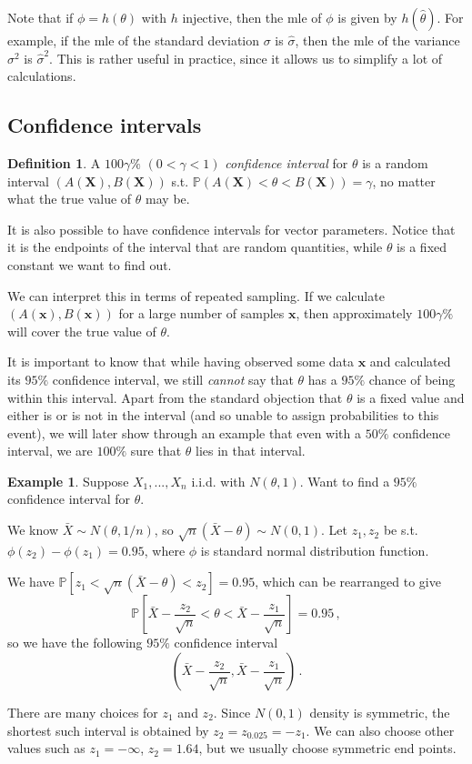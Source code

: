 \documentclass[a4paper,11pt]{article}
\theoremstyle{definition}
\newtheorem*{defn}{Definition}
\newtheorem*{ex}{Example}
\numberwithin{equation}{section}
\begin{document}
Note that if $\phi=h(\theta)$ with $h$ injective, then the mle of $\phi$ is given by $h(\hat{\theta})$. For example, if the mle of the standard deviation $\sigma$ is $\hat{\sigma}$, then the mle of the variance $\sigma^2$ is $\hat{\sigma}^2$. This is rather useful in practice, since it allows us to simplify a lot of calculations.

\subsection{Confidence intervals}
\begin{defn}
A $100\gamma\%$ $(0<\gamma<1)$ \emph{confidence interval} for $\theta$ is a random interval $(A(\mathbf{X}),B(\mathbf{X}))$ s.t. $\mathbb{P}(A(\mathbf{X})<\theta<B(\mathbf{X}))=\gamma$, no matter what the true value of $\theta$ may be.
\end{defn}

It is also possible to have confidence intervals for vector parameters. Notice that it is the endpoints of the interval that are random quantities, while $\theta$ is a fixed constant we want to find out.

We can interpret this in terms of repeated sampling. If we calculate $(A(\mathbf{x}),B(\mathbf{x}))$ for a large number of samples $\mathbf{x}$, then approximately $100\gamma\%$ will cover the true value of $\theta$.

It is important to know that while having observed some data $\mathbf{x}$ and calculated its $95\%$ confidence interval, we still \emph{cannot} say that $\theta$ has a $95\%$ chance of being within this interval. Apart from the standard objection that $\theta$ is a fixed value and either is or is not in the interval (and so unable to assign probabilities to this event), we will later show through an example that even with a $50\%$ confidence interval, we are $100\%$ sure that $\theta$ lies in that interval.

\begin{ex}
Suppose $X_1,...,X_n$ i.i.d. with $N(\theta,1)$. Want to find a $95\%$ confidence interval for $\theta$.

We know $\bar{X}\sim N(\theta,1/n)$, so $\sqrt{n}(\bar{X}-\theta)\sim N(0,1)$. Let $z_1,z_2$ be s.t. $\phi(z_2)-\phi(z_1)=0.95$, where $\phi$ is standard normal distribution function.

We have $\mathbb{P}[z_1<\sqrt{n}(\bar{X}-\theta)<z_2]=0.95$, which can be rearranged to give
\[
\mathbb{P}\left[\bar{X}-\frac{z_2}{\sqrt{n}}<\theta<\bar{X}-\frac{z_1}{\sqrt{n}}\right]=0.95\,,
\]
so we have the following $95\%$ confidence interval
\[
\left(\bar{X}-\frac{z_2}{\sqrt{n}},\bar{X}-\frac{z_1}{\sqrt{n}}\right)\,.
\]

There are many choices for $z_1$ and $z_2$. Since $N(0,1)$ density is symmetric, the shortest such interval is obtained by $z_2=z_{0.025}=-z_1$. We can also choose other values such as $z_1=-\infty$, $z_2=1.64$, but we usually choose symmetric end points.
\end{ex}
\end{document}
